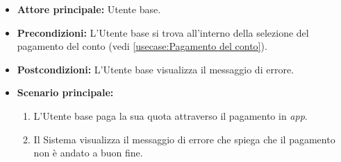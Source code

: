 \label{usecase:Errore pagamento}
\begin{itemize}
	\item \textbf{Attore principale:} Utente base.

	\item \textbf{Precondizioni:}
	      L'Utente base si trova all'interno della selezione del pagamento del conto (vedi \autoref{usecase:Pagamento del conto}).

	\item \textbf{Postcondizioni:}
	      L'Utente base visualizza il messaggio di errore.

	\item \textbf{Scenario principale:}
	      \begin{enumerate}
		      \item L'Utente base paga la sua quota attraverso il pagamento in \textit{app}.

		      \item Il Sistema visualizza il messaggio di errore che spiega che il pagamento non è andato a buon fine.
	      \end{enumerate}
\end{itemize}
